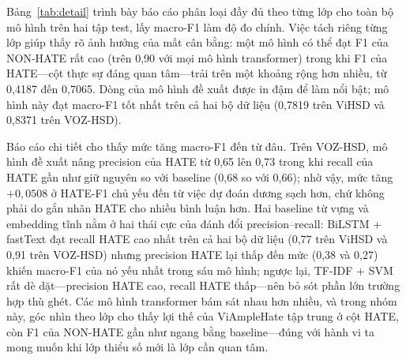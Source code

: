 \documentclass[11pt]{article}
\begin{document}
Bảng~\ref{tab:detail} trình bày báo cáo phân loại đầy đủ theo từng lớp cho toàn bộ mô hình trên hai tập test, lấy macro-F1 làm độ đo chính. Việc tách riêng từng lớp giúp thấy rõ ảnh hưởng của mất cân bằng: một mô hình có thể đạt F1 của NON-HATE rất cao (trên 0,90 với mọi mô hình transformer) trong khi F1 của HATE---cột thực sự đáng quan tâm---trải trên một khoảng rộng hơn nhiều, từ 0,4187 đến 0,7065. Dòng của mô hình đề xuất được in đậm để làm nổi bật; mô hình này đạt macro-F1 tốt nhất trên cả hai bộ dữ liệu (0,7819 trên ViHSD và 0,8371 trên VOZ-HSD).

Báo cáo chi tiết cho thấy mức tăng macro-F1 đến từ đâu. Trên VOZ-HSD, mô hình đề xuất nâng precision của HATE từ 0,65 lên 0,73 trong khi recall của HATE gần như giữ nguyên so với baseline (0,68 so với 0,66); nhờ vậy, mức tăng $+0{,}0508$ ở HATE-F1 chủ yếu đến từ việc dự đoán dương sạch hơn, chứ không phải do gắn nhãn HATE cho nhiều bình luận hơn. Hai baseline từ vựng và embedding tĩnh nằm ở hai thái cực của đánh đổi precision--recall: BiLSTM + fastText đạt recall HATE cao nhất trên cả hai bộ dữ liệu (0,77 trên ViHSD và 0,91 trên VOZ-HSD) nhưng precision HATE lại thấp đến mức (0,38 và 0,27) khiến macro-F1 của nó yếu nhất trong sáu mô hình; ngược lại, TF-IDF + SVM rất dè dặt---precision HATE cao, recall HATE thấp---nên bỏ sót phần lớn trường hợp thù ghét. Các mô hình transformer bám sát nhau hơn nhiều, và trong nhóm này, góc nhìn theo lớp cho thấy lợi thế của ViAmpleHate tập trung ở cột HATE, còn F1 của NON-HATE gần như ngang bằng baseline---đúng với hành vi ta mong muốn khi lớp thiểu số mới là lớp cần quan tâm.

\begin{table}[!t]
  \centering
  \small
  \caption{Kết quả theo từng lớp của ViAmpleHate (tập test).}
  \label{tab:perclass}
\end{table}
\end{document}

